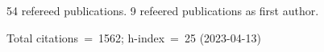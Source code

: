 54 refereed publications. 9 refeered publications as first author.

Total citations~=~1562; h-index~=~25 (2023-04-13)